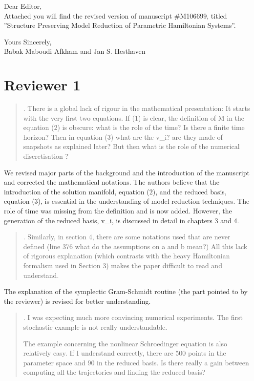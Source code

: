 \documentclass[a4paper]{article}
\newcommand{\breview}{\begin{quotation}\begin{bf}\noindent}
\newcommand{\ereview}{\end{bf}\end{quotation}}
\begin{document}
Dear Editor, \\[1cm]

Attached you will find the revised version of manuscript \#M106699, titled ''Structure Preserving Model Reduction of Parametric Hamiltonian Systems''.

Yours Sincerely,\\[1.0cm]
Babak Maboudi Afkham and
Jan S. Hesthaven
\\[1cm]

\section*{Reviewer 1}

\breview
1. There is a global lack of rigour in the mathematical presentation: It starts with the very first two equations. If (1) is clear, the definition of M in the equation (2) is obscure: what is the role of the time? Is there a finite time horizon? Then in equation (3) what are the v\_i? are they made of snapshots as explained later? But then what is the role of the numerical discretisation ?
\ereview

We revised major parts of the background and the introduction of the manuscript and corrected the mathematical notations. The authors believe that the introduction of the solution manifold, equation (2), and the reduced basis, equation (3), is essential in the understanding of model reduction techniques. The role of time was missing from the definition and is now added. However, the generation of the reduced basis, v\_i, is discussed in detail in chapters 3 and 4.

\breview
2. Similarly, in section 4, there are some notations used that are never defined (line 376 what do the assumptions on a and b mean?) All this lack of rigorous explanation (which contrasts with the heavy Hamiltonian formalism used in Section 3) makes the paper difficult to read and understand. 
\ereview

The explanation of the symplectic Gram-Schmidt routine (the part pointed to by the reviewer) is revised for better understanding.

\breview
3. I was expecting much more convincing numerical experiments. The first stochastic example is not really understandable.

The example concerning the nonlinear Schroedinger equation is also relatively easy. If I understand correctly, there are 500 points in the parameter space and 90 in the reduced basis. Is there really a gain between computing all the trajectories and finding the reduced basis?
\ereview
\end{document}
